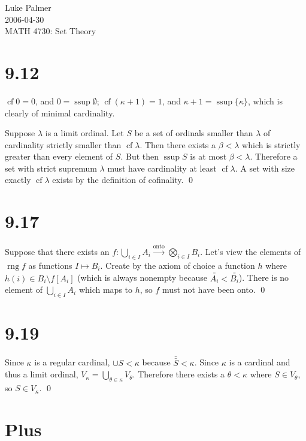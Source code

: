 \documentclass[12pt]{article}
\DeclareMathOperator{\ssup}{ssup}
\DeclareMathOperator{\cf}{cf}
\DeclareMathOperator{\rng}{rng}
\begin{document}
\noindent Luke Palmer \\
2006-04-30 \\
MATH 4730: Set Theory

\section*{9.12}

$\cf{0} = 0$, and $0 = \ssup \emptyset$;  $\cf{(\kappa+1)} = 1$, and
$\kappa+1 = \ssup{\{\kappa\}}$, which is clearly of minimal cardinality.

Suppose $\lambda$ is a limit ordinal.  Let $S$ be a set of ordinals
smaller than $\lambda$ of cardinality strictly smaller than $\cf
\lambda$.  Then there exists a $\beta < \lambda$ which is strictly
greater than every element of $S$.  But then $\ssup S$ is at most $\beta
< \lambda$.  Therefore a set with strict supremum $\lambda$ must have
cardinality at least $\cf \lambda$.  A set with size exactly $\cf
\lambda$ exists by the definition of cofinality. \qed

\section*{9.17}

Suppose that there exists an $f: \bigcup\limits_{i \in I} A_i
\xrightarrow{\text{onto}} \bigotimes\limits_{i \in I} B_i$.  Let's view
the elements of $\rng f$ as functions $I \mapsto B_i$.  Create by the
axiom of choice a function $h$ where $h(i) \in B_i \setminus f[A_i]$
(which is always nonempty because $\bar{\bar{A_i}} < \bar{\bar{B_i}}$).
There is no element of $\bigcup\limits_{i \in I} A_i$ which maps to $h$,
so $f$ must not have been onto. \qed

\section*{9.19}

Since $\kappa$ is a regular cardinal, $\cup S < \kappa$ because
$\bar{\bar{S}} < \kappa$.  Since $\kappa$ is a cardinal and thus a limit
ordinal, $V_\kappa = \bigcup\limits_{\theta \in \kappa} V_\theta$.
Therefore there exists a $\theta < \kappa$ where $S \in V_\theta$, so $S
\in V_\kappa$.  \qed

\section*{Plus}
\end{document}
